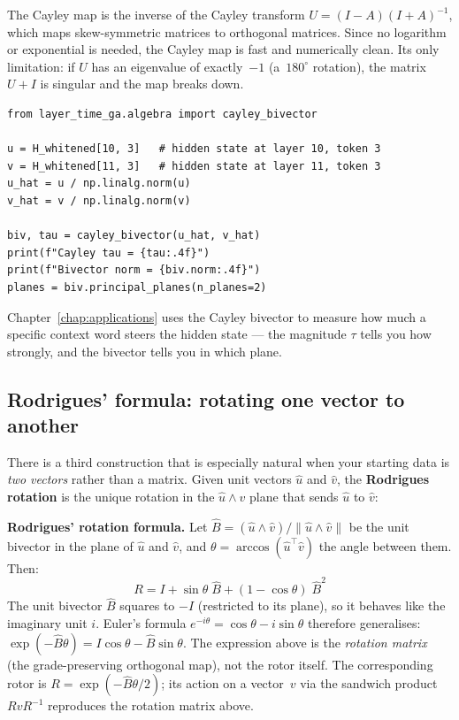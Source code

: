 \documentclass[11pt, twoside, openright]{memoir}
\newcommand{\op}{\wedge}          %
\numberwithin{equation}{chapter}
\begin{document}
The Cayley map is the inverse of the Cayley transform
$U = (I - A)(I + A)^{-1}$, which maps skew-symmetric matrices to
orthogonal matrices.  Since no logarithm or exponential is needed, the
Cayley map is fast and numerically clean.  Its only limitation: if $U$
has an eigenvalue of exactly~$-1$ (a~$180^\circ$ rotation), the matrix
$U + I$ is singular and the map breaks down.

\begin{lstlisting}[caption={Cayley bivector from two vectors}]
from layer_time_ga.algebra import cayley_bivector

u = H_whitened[10, 3]   # hidden state at layer 10, token 3
v = H_whitened[11, 3]   # hidden state at layer 11, token 3
u_hat = u / np.linalg.norm(u)
v_hat = v / np.linalg.norm(v)

biv, tau = cayley_bivector(u_hat, v_hat)
print(f"Cayley tau = {tau:.4f}")
print(f"Bivector norm = {biv.norm:.4f}")
planes = biv.principal_planes(n_planes=2)
\end{lstlisting}

Chapter~\ref{chap:applications} uses the Cayley bivector to measure how
much a specific context word steers the hidden state --- the magnitude
$\tau$ tells you how strongly, and the bivector tells you in which plane.

\subsection*{Rodrigues' formula: rotating one vector to another}

There is a third construction that is especially natural when your
starting data is \emph{two vectors} rather than a matrix.  Given unit
vectors $\hat{u}$ and $\hat{v}$, the \textbf{Rodrigues rotation} is the
unique rotation in the $\hat{u} \op \hat{v}$ plane that sends $\hat{u}$
to $\hat{v}$:

\begin{gabox}
\textbf{Rodrigues' rotation formula.}
Let $\hat{B} = (\hat{u} \op \hat{v}) / \|\hat{u} \op \hat{v}\|$ be the
unit bivector in the plane of $\hat{u}$ and $\hat{v}$, and
$\theta = \arccos(\hat{u}^\top \hat{v})$ the angle between them.  Then:
\begin{equation}
  R = I + \sin\theta \; \hat{B} + (1 - \cos\theta) \; \hat{B}^2
\end{equation}
The unit bivector $\hat{B}$ squares to $-I$ (restricted to its plane),
so it behaves like the imaginary unit $i$.  Euler's formula
$e^{-i\theta} = \cos\theta - i\sin\theta$ therefore generalises:
$\exp(-\hat{B}\theta) = I\cos\theta - \hat{B}\sin\theta$.
The expression above is the \emph{rotation matrix} (the grade-preserving
orthogonal map), not the rotor itself.  The corresponding rotor is
$R = \exp(-\hat{B}\theta/2)$; its action on a vector~$v$ via the
sandwich product $RvR^{-1}$ reproduces the rotation matrix above.
\end{gabox}
\end{document}
